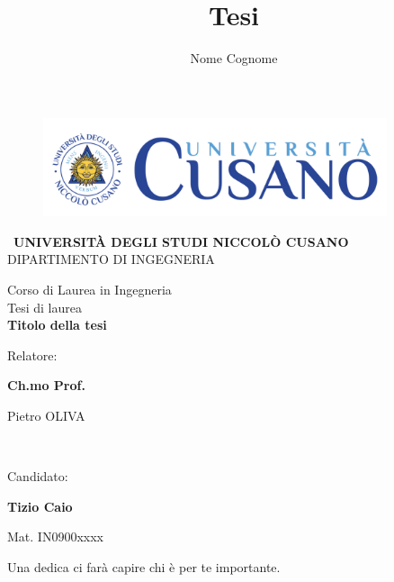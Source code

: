 \documentclass[a4paper, 11pt, oneside]{book}
\title{Tesi}  %
\author{Nome Cognome}  %
\newenvironment{dedication}
  {\clearpage           %
   \thispagestyle{empty}%
   \vspace*{\stretch{1}}%
   \itshape             %
   \raggedleft          %
  }
  {\par %
   \vspace{\stretch{3}} %
   \clearpage           %
  }
\begin{document}
\begin{titlepage}
\begin{figure}[H]
        \centering
        \includegraphics[width=0.9\textwidth]{unicusano.png}
    \end{figure}
   \begin{center}
        \ {\uppercase{\bf {\Large università degli studi Niccolò Cusano}}}\\[5mm]
    	\uppercase{\normalsize Dipartimento di Ingegneria}\\
    \end{center}
    
    \begin{center}
    	\normalsize{Corso di Laurea in Ingegneria}\\[20mm]
    	\large{Tesi di laurea}\\[10mm]
        {\Huge{\bf Titolo della tesi}}\\[3mm]
    \end{center}
    
   \vspace{20mm}
    \noindent
    \begin{minipage}[t]{0.47\textwidth}
    	{\large{Relatore:\par\bf Ch.mo Prof.\par Pietro OLIVA}}
    	\vspace{20mm}\\
    	
    \end{minipage}
    \hfill
    \begin{minipage}[t]{0.4\textwidth}\raggedleft
    	{\large{Candidato:\par \bf Tizio Caio\par Mat.  IN0900xxxx}}
    \end{minipage}
    
    \vfill  
\end{titlepage}

\begin{dedication}

Una dedica ci farà capire chi è per te importante.

\end{dedication}
\end{document}
